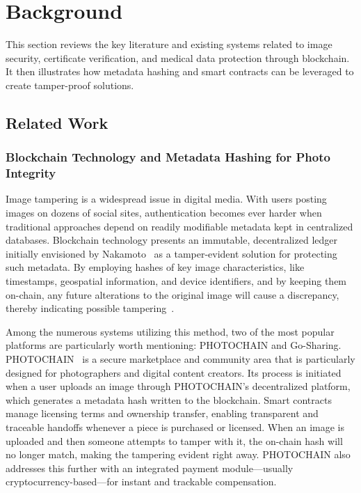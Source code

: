 \chapter{Background}
This section reviews the key literature and existing systems related to image security, certificate verification, and medical data protection through blockchain. It then illustrates how metadata hashing and smart contracts can be leveraged to create tamper-proof solutions.

\section{Related Work}

\subsection{Blockchain Technology and Metadata Hashing for Photo Integrity}
Image tampering is a widespread issue in digital media. With users posting images on dozens
of social sites, authentication becomes ever harder when traditional approaches depend on
readily modifiable metadata kept in centralized databases. Blockchain technology presents
an immutable, decentralized ledger initially envisioned by Nakamoto~\cite{nakamoto2008} as
a tamper-evident solution for protecting such metadata. By employing hashes of key image
characteristics, like timestamps, geospatial information, and device identifiers, and by
keeping them on-chain, any future alterations to the original image will cause a discrepancy,
thereby indicating possible tampering~\cite{cheng2020}.

Among the numerous systems utilizing this method, two of the most popular platforms are
particularly worth mentioning: PHOTOCHAIN and Go-Sharing. PHOTOCHAIN~\cite{wessely2023} is
a secure marketplace and community area that is particularly designed for photographers
and digital content creators. Its process is initiated when a user uploads an image
through PHOTOCHAIN's decentralized platform, which generates a metadata hash written to
the blockchain. Smart contracts manage licensing terms and ownership transfer, enabling
transparent and traceable handoffs whenever a piece is purchased or licensed. When an
image is uploaded and then someone attempts to tamper with it, the on-chain hash will no
longer match, making the tampering evident right away. PHOTOCHAIN also addresses this further
with an integrated payment module---usually cryptocurrency-based---for instant and trackable
compensation.

